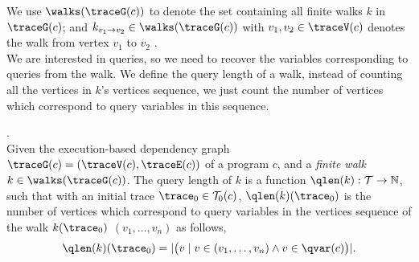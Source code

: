 We use $\walks(\traceG(c))$ to denote 
the set containing all finite walks $k$ in $\traceG(c)$;
and $k_{v_1 \to v_2} \in \walks(\traceG(c))$ with $v_1, v_2 \in \traceV(c)$ denotes the walk from vertex $v_1$ to $v_2$ . 
\\
We are interested in queries, so we need to recover the 
variables corresponding to queries from the walk. We define the query length of a walk, 
instead of counting all 
the vertices in $k$'s vertices sequence, we just count the number of vertices which correspond to query variables in this sequence.
%
\begin{defn}.
\label{def:qlen}
\\
Given 
the execution-based dependency graph 
$\traceG({c}) = (\traceV({c}), \traceE({c}))$ of a program $c$,
 and a \emph{finite walk} 
 $k \in \walks(\traceG(c))$. 
The query length of $k$ is a function $\qlen(k): \mathcal{T} \to \mathbb{N}$, such that with an initial trace  $\trace_0 \in \mathcal{T}_0(c)$, $\qlen(k)(\trace_0)$ is
the number of vertices which correspond to query variables in the vertices sequence of the walk $k(\trace_0)$
$(v_1, \ldots, v_{n})$ as follows, 
\[
  \qlen(k)(\trace_0) = |\big( v \mid v \in (v_1, \ldots, v_{n}) \land v \in \qvar(c) \big)|.
\]
\end{defn}

